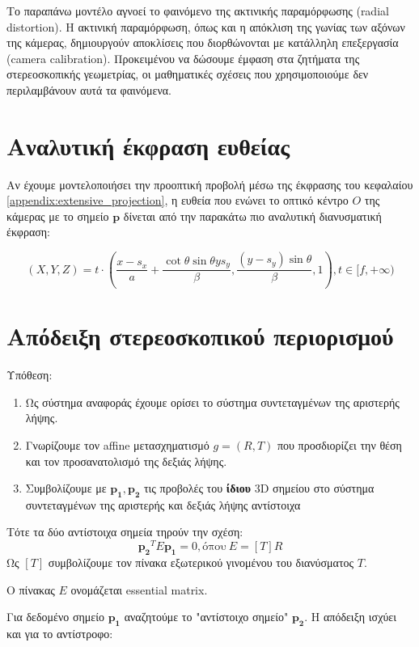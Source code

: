 Το παραπάνω μοντέλο αγνοεί το φαινόμενο της ακτινικής παραμόρφωσης (\e radial distortion\g). Η ακτινική παραμόρφωση, όπως και η απόκλιση της γωνίας των αξόνων της κάμερας, δημιουργούν αποκλίσεις που διορθώνονται με κατάλληλη επεξεργασία \e(camera calibration). \g Προκειμένου να δώσουμε έμφαση στα ζητήματα της στερεοσκοπικής γεωμετρίας, οι μαθηματικές σχέσεις που χρησιμοποιούμε δεν περιλαμβάνουν αυτά τα φαινόμενα.


\section{Αναλυτική έκφραση ευθείας}
\label{appendix:extensive_projection_line}

Αν έχουμε μοντελοποιήσει την προοπτική προβολή μέσω της έκφρασης του κεφαλαίου \ref{appendix:extensive_projection}, η ευθεία που ενώνει το οπτικό κέντρο $O$ της κάμερας με το σημείο $\mathbf{p}$ δίνεται από την παρακάτω πιο αναλυτική διανυσματική έκφραση:

$$ (X,Y,Z) = t\cdot \left ( \dfrac{x-s_x}{a} + \dfrac{\cot \theta \sin \theta y s_y}{\beta} , \dfrac{(y-s_y) \sin \theta}{\beta} , 1\right),  t \in [f,+\infty) $$

\section{Απόδειξη στερεοσκοπικού περιορισμού}
\label{appendix:epipolar_constraint_proof}

Υπόθεση:

\begin{enumerate}
	\item Ως σύστημα αναφοράς έχουμε ορίσει το σύστημα συντεταγμένων της αριστερής λήψης.
	\item Γνωρίζουμε τον \e affine \g μετασχηματισμό $g = (R,T)$ που προσδιορίζει την θέση και τον προσανατολισμό της δεξιάς λήψης.
	\item Συμβολίζουμε με $\mathbf{p_1},\mathbf{p_2}$ τις προβολές του \textbf{ίδιου} \e 3D \g σημείου στο σύστημα συντεταγμένων της αριστερής και δεξιάς λήψης αντίστοιχα
\end{enumerate}

Τότε τα δύο αντίστοιχα σημεία τηρούν την σχέση: $$\mathbf{p_2}^{T} E \mathbf{p_1} = 0, \text{όπου} \: E = [T]R$$ Ως $[T]$ συμβολίζουμε τον πίνακα εξωτερικού γινομένου του διανύσματος $T$. 

Ο πίνακας $E$ ονομάζεται \e essential matrix. \g 

Για δεδομένο σημείο $\mathbf{p_1}$ αναζητούμε το "αντίστοιχο σημείο" $\mathbf{p_2}$. Η απόδειξη ισχύει και για το αντίστροφο:


